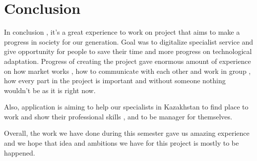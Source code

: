 \chapter{Conclusion}\label{ch:concl}
\hspace{7mm}In conclusion , it's a great experience to work on project that aims to make a progress in society for our generation. Goal was to digitalize specialist service and give opportunity for people to save their time and more progress on technological adaptation. Progress of creating the project gave enormous amount of experience on how market works , how to communicate with each other and work in group , how every part in the project is important and without someone nothing wouldn't be as it is right now. 


Also, application is aiming to help our specialists in Kazakhstan to find place to work and show their professional skills , and to be manager for themselves. 


Overall, the work we have done during this semester gave us amazing experience and we hope that idea and ambitions we have for this project is mostly to be happened.